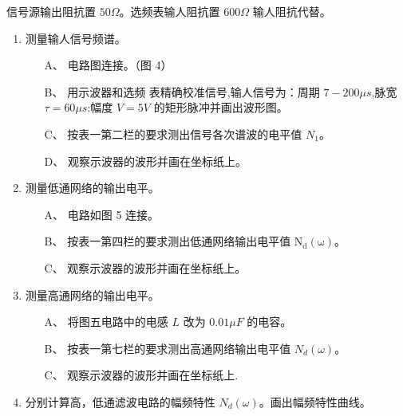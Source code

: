 \documentclass[dvipsnames, svgnames,a4paper,11pt]{article}
\begin{document}
信号源输出阻抗置 $50\Omega$。选频表输人阻抗置 $600\Omega$ 输人阻抗代替。

\begin{figure}[htbp]
	\centering
	\caption{}
\end{figure}

\begin{enumerate}
	\item 测量输人信号频谱。
	\begin{enumerate}
    \item[A、] 电路图连接。（图 4）
    \item[B、] 用示波器和选频 表精确校准信号,输人信号为：周期 $7-200\mu s$,脉宽 $\tau =60 \mu s$:幅度 $V=5V$ 的矩形脉冲并画出波形图。
    \item[C、] 按表一第二栏的要求测出信号各次谱波的电平值 $N_1$。
    \item[D、] 观察示波器的波形并画在坐标纸上。
  \end{enumerate}
	\item 测量低通网络的输出电平。
	  \begin{enumerate}
      \item[A、] 电路如图 5 连接。
      \item[B、] 按表一第四栏的要求测出低通网络输出电平值 $\mathrm{N_d(\omega)}$。
      \item[C、] 观察示波器的波形并画在坐标纸上。
    \end{enumerate}
  \item 测量高通网络的输出电平。
    \begin{enumerate}
      \item[A、] 将图五电路中的电感 $L$ 改为 $0.01\mu F$ 的电容。
      \item[B、] 按表一第七栏的要求测出高通网络输出电平值 $N_d(\omega)$。
      \item[C、] 观察示波器的波形并画在坐标纸上.
    \end{enumerate}
  \item 分别计算高，低通滤波电路的幅频特性 $N_d(\omega)$。画出幅频特性曲线。
\end{enumerate}

\begin{figure}[htbp]
	\centering
	\caption{}
\end{figure}
\end{document}
